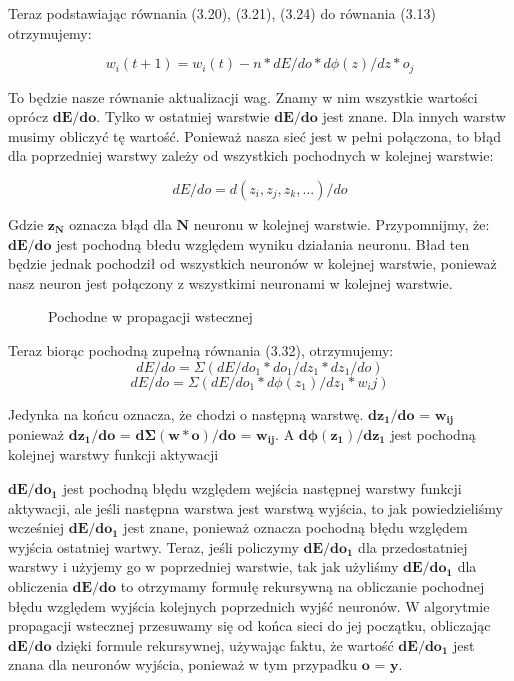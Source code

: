 \noindent Teraz podstawiając równania (3.20), (3.21), (3.24) do równania (3.13) otrzymujemy:

\begin{equation}
w_i(t+1) = w_i(t) - n * dE/do * d \phi(z)/dz * o_j
\end{equation}

\noindent To będzie nasze równanie aktualizacji wag. Znamy w nim wszystkie wartości oprócz $\boldsymbol{dE/do}$. Tylko w ostatniej warstwie $\boldsymbol{dE/do}$ jest znane. Dla innych warstw musimy obliczyć tę wartość. Ponieważ nasza sieć jest w pełni połączona, to błąd dla poprzedniej warstwy zależy od wszystkich pochodnych w kolejnej warstwie:

\begin{equation}
dE/do = d(z_i, z_j, z_k, ...) / do
\end{equation}

\noindent Gdzie $\boldsymbol{z_N}$ oznacza błąd dla $\boldsymbol{N}$ neuronu w kolejnej warstwie. Przypomnijmy, że: $\boldsymbol{dE/do}$ jest pochodną błedu względem wyniku działania neuronu. Bład ten będzie jednak pochodził od wszystkich neuronów w kolejnej warstwie, ponieważ nasz neuron jest połączony z wszystkimi neuronami w kolejnej warstwie.

\clearpage
\begin{figure}[H]
\centering

\caption{Pochodne w propagacji wstecznej}
\end{figure}
\clearpage

\noindent Teraz biorąc pochodną zupełną równania (3.32), otrzymujemy:
\begin{equation}
dE/do = \Sigma(dE/do_1 * do_1/dz_1 * dz_1/ do)
\end{equation}
\begin{equation}
dE/do = \Sigma(dE/do_1 * d \phi(z_1)/dz_1 * w_ij)
\end{equation}

\noindent Jedynka na końcu oznacza, że chodzi o następną warstwę.
$\boldsymbol{dz_1/do}$ = $\boldsymbol{w_{ij}}$ ponieważ $\boldsymbol{dz_1/do}$ = $\boldsymbol{d \Sigma(w * o) / do}$ = $\boldsymbol{w_{ij}}$. A $\boldsymbol{d \phi(z_1)/dz_1}$ jest pochodną kolejnej warstwy funkcji aktywacji\newline

$\boldsymbol{dE/do_1}$ jest pochodną błędu względem wejścia następnej warstwy funkcji aktywacji, ale jeśli następna warstwa jest warstwą wyjścia, to jak powiedzieliśmy wcześniej $\boldsymbol{dE/do_1}$ jest znane, ponieważ oznacza pochodną błędu względem wyjścia ostatniej wartwy. Teraz, jeśli policzymy $\boldsymbol{dE/do_1}$ dla przedostatniej warstwy i użyjemy go w poprzedniej warstwie, tak jak użyliśmy $\boldsymbol{dE/do_1}$ dla obliczenia $\boldsymbol{dE/do}$ to otrzymamy formułę rekursywną na obliczanie pochodnej błędu względem wyjścia kolejnych poprzednich wyjść neuronów. W algorytmie propagacji wstecznej przesuwamy się od końca sieci do jej początku, obliczając $\boldsymbol{dE/do}$ dzięki formule rekursywnej, używając faktu, że wartość $\boldsymbol{dE/do_1}$ jest znana dla neuronów wyjścia, ponieważ w tym przypadku $\boldsymbol{o}$ = $\boldsymbol{y}$.

